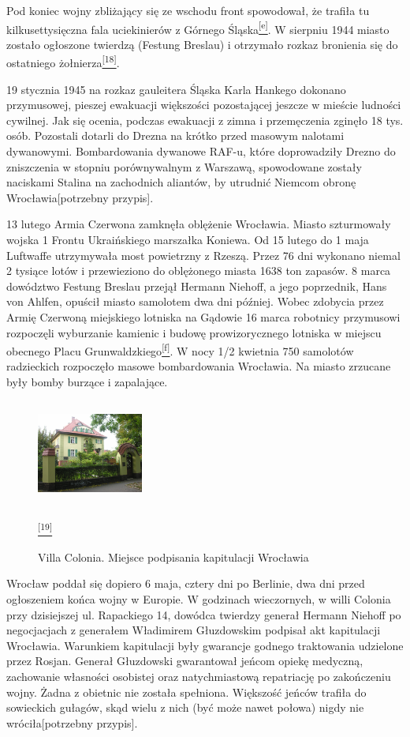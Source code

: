 \documentclass{article}
\begin{document}
Pod koniec wojny zbliżający się ze wschodu front spowodował, że trafiła tu kilkusettysięczna fala uciekinierów z Górnego Śląska\hyperlink{e}{\textsuperscript{[e]}}. W sierpniu 1944 miasto zostało ogłoszone twierdzą (Festung Breslau) i otrzymało rozkaz bronienia się do ostatniego żołnierza\hyperlink{18}{\textsuperscript{[18]}}.

19 stycznia 1945 na rozkaz gauleitera Śląska Karla Hankego dokonano przymusowej, pieszej ewakuacji większości pozostającej jeszcze w mieście ludności cywilnej. Jak się ocenia, podczas ewakuacji z zimna i przemęczenia zginęło 18 tys. osób. Pozostali dotarli do Drezna na krótko przed masowym nalotami dywanowymi. Bombardowania dywanowe RAF-u, które doprowadziły Drezno do zniszczenia w stopniu porównywalnym z Warszawą, spowodowane zostały naciskami Stalina na zachodnich aliantów, by utrudnić Niemcom obronę Wrocławia[potrzebny przypis].

13 lutego Armia Czerwona zamknęła oblężenie Wrocławia. Miasto szturmowały wojska 1 Frontu Ukraińskiego marszałka Koniewa. Od 15 lutego do 1 maja Luftwaffe utrzymywała most powietrzny z Rzeszą. Przez 76 dni wykonano niemal 2 tysiące lotów i przewieziono do oblężonego miasta 1638 ton zapasów. 8 marca dowództwo Festung Breslau przejął Hermann Niehoff, a jego poprzednik, Hans von Ahlfen, opuścił miasto samolotem dwa dni później. Wobec zdobycia przez Armię Czerwoną miejskiego lotniska na Gądowie 16 marca robotnicy przymusowi rozpoczęli wyburzanie kamienic i budowę prowizorycznego lotniska w miejscu obecnego Placu Grunwaldzkiego\hyperlink{f}{\textsuperscript{[f]}}. W nocy 1/2 kwietnia 750 samolotów radzieckich rozpoczęło masowe bombardowania Wrocławia. Na miasto zrzucane były bomby burzące i zapalające.

\begin{figure}
\includegraphics[width= 3.5cm, height= 3.5cm]{images/Zdjecie15.JPG}
\caption{Villa Colonia. Miejsce podpisania kapitulacji Wrocławia}
\hyperlink{19}{\textsuperscript{[19]}}
\end{figure}
Wrocław poddał się dopiero 6 maja, cztery dni po Berlinie, dwa dni przed ogłoszeniem końca wojny w Europie. W godzinach wieczornych, w willi Colonia przy dzisiejszej ul. Rapackiego 14, dowódca twierdzy generał Hermann Niehoff po negocjacjach z generałem Władimirem Głuzdowskim podpisał akt kapitulacji Wrocławia. Warunkiem kapitulacji były gwarancje godnego traktowania udzielone przez Rosjan. Generał Głuzdowski gwarantował jeńcom opiekę medyczną, zachowanie własności osobistej oraz natychmiastową repatriację po zakończeniu wojny. Żadna z obietnic nie została spełniona. Większość jeńców trafiła do sowieckich gułagów, skąd wielu z nich (być może nawet połowa) nigdy nie wróciła[potrzebny przypis].
\end{document}
